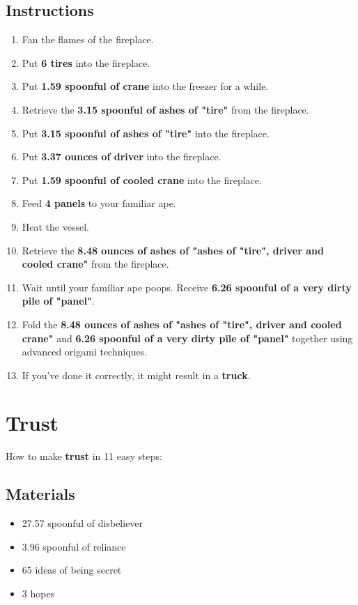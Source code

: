 \documentclass{article}
\begin{document}
\subsection{Instructions}\begin{enumerate}
\item 
Fan the flames of the fireplace.
\item 
Put \textbf{6 tires} into the fireplace.
\item 
Put \textbf{1.59 spoonful of crane} into the freezer for a while.
\item 
Retrieve the \textbf{3.15 spoonful of ashes of "tire"} from the fireplace.
\item 
Put \textbf{3.15 spoonful of ashes of "tire"} into the fireplace.
\item 
Put \textbf{3.37 ounces of driver} into the fireplace.
\item 
Put \textbf{1.59 spoonful of cooled crane} into the fireplace.
\item 
Feed \textbf{4 panels} to your familiar ape.
\item 
Heat the vessel.
\item 
Retrieve the \textbf{8.48 ounces of ashes of "ashes of "tire", driver and cooled crane"} from the fireplace.
\item 
Wait until your familiar ape poops. Receive \textbf{6.26 spoonful of a very dirty pile of "panel"}.
\item 
Fold the \textbf{8.48 ounces of ashes of "ashes of "tire", driver and cooled crane"} and \textbf{6.26 spoonful of a very dirty pile of "panel"} together using advanced origami techniques.
\item 
If you've done it correctly, it might result in a \textbf{truck}.
\end{enumerate}
\newpage
\section{Trust}How to make \textbf{trust} in 11 easy steps:

\subsection{Materials}\begin{itemize}
\item 
27.57 spoonful of disbeliever
\item 
3.96 spoonful of reliance
\item 
65 ideas of being secret
\item 
3 hopes
\end{itemize}
\end{document}
